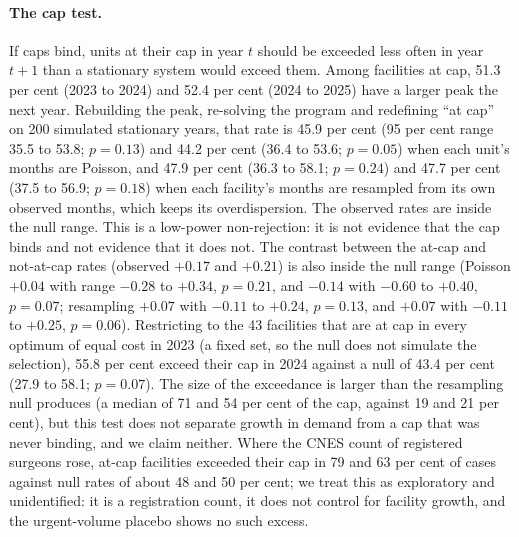 \paragraph{The cap test.} If caps bind, units at their cap in year $t$ should be exceeded less often in year $t+1$ than a
stationary system would exceed them. Among facilities at cap, 51.3 per cent (2023 to 2024) and 52.4 per cent (2024 to 2025) have a
larger peak the next year. Rebuilding the peak, re-solving the program and redefining ``at cap'' on 200 simulated stationary years,
that rate is 45.9 per cent (95 per cent range 35.5 to 53.8; $p = 0.13$) and 44.2 per cent (36.4 to 53.6; $p = 0.05$) when each unit's
months are Poisson, and 47.9 per cent (36.3 to 58.1; $p = 0.24$) and 47.7 per cent (37.5 to 56.9; $p = 0.18$) when each facility's
months are resampled from its own observed months, which keeps its overdispersion. The observed rates are inside the null range. This is a
low-power non-rejection: it is not evidence that the cap binds and not evidence that it does not. The contrast between the at-cap and not-at-cap rates
(observed $+0.17$ and $+0.21$) is also inside the null range (Poisson $+0.04$ with range $-0.28$ to $+0.34$, $p = 0.21$, and $-0.14$ with $-0.60$ to $+0.40$, $p = 0.07$; resampling $+0.07$
with $-0.11$ to $+0.24$, $p = 0.13$, and $+0.07$ with $-0.11$ to $+0.25$, $p = 0.06$). Restricting to the 43 facilities that are at cap in every optimum of equal cost in 2023 (a fixed set, so the null does not simulate the
selection), 55.8 per cent exceed their cap in 2024 against a null of 43.4 per cent (27.9 to 58.1; $p = 0.07$). The size of the exceedance is larger than the resampling null produces
(a median of 71 and 54 per cent of the cap, against 19 and 21 per cent), but this test does not separate growth in demand from a cap that was never binding, and we
claim neither. Where the CNES count of registered surgeons rose, at-cap facilities exceeded their cap in 79 and 63 per cent of cases against null rates of about 48 and 50 per cent; we treat this as
exploratory and unidentified: it is a registration count, it does not control for facility growth, and the urgent-volume placebo shows no such excess.

